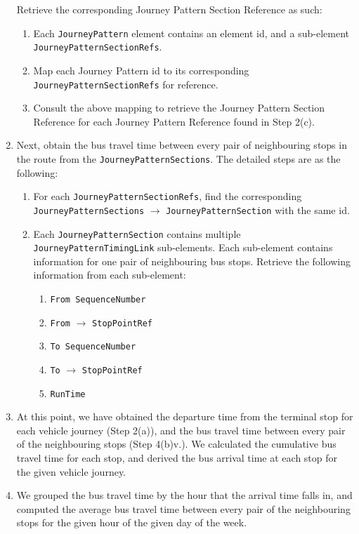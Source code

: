 \begin{enumerate}
  Retrieve the corresponding Journey Pattern Section Reference as such:
    \begin{enumerate}
      \item Each \texttt{JourneyPattern} element contains an element id, and a sub-element \texttt{JourneyPatternSectionRefs}.
      \item Map each Journey Pattern id to its corresponding \\ \texttt{JourneyPatternSectionRefs} for reference.
      \item Consult the above mapping to retrieve the Journey Pattern Section Reference for each Journey Pattern Reference found in Step 2(c).
    \end{enumerate}
    \item Next, obtain the bus travel time between every pair of neighbouring stops in the route from the \texttt{JourneyPatternSections}. The detailed steps are as the following:
    \begin{enumerate}
      \item For each \texttt{JourneyPatternSectionRefs}, find the corresponding \texttt{JourneyPatternSections} $\rightarrow$ \texttt{JourneyPatternSection} with the same id.
      \item Each \texttt{JourneyPatternSection} contains multiple \\ \texttt{JourneyPatternTimingLink} sub-elements. Each sub-element contains information for one pair of neighbouring bus stops. Retrieve the following information from each sub-element:
      \begin{enumerate}
        \item \texttt{From SequenceNumber}
        \item \texttt{From} $\rightarrow$ \texttt{StopPointRef}
        \item \texttt{To SequenceNumber}
        \item \texttt{To} $\rightarrow$ \texttt{StopPointRef}
        \item \texttt{RunTime}
      \end{enumerate}
    \end{enumerate}
    \item At this point, we have obtained the departure time from the terminal stop for each vehicle journey (Step 2(a)), and the bus travel time between every pair of the neighbouring stops (Step 4(b)v.). We calculated the cumulative bus travel time for each stop, and derived the bus arrival time at each stop for the given vehicle journey.
    \item We grouped the bus travel time by the hour that the arrival time falls in, and computed the average bus travel time between every pair of the neighbouring stops for the given hour of the given day of the week.
\end{enumerate}



